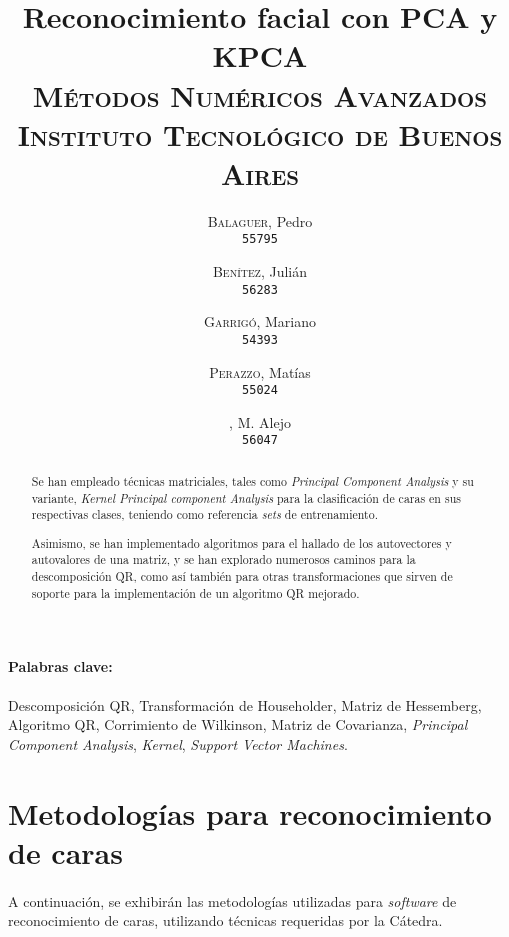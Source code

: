 \documentclass[12pt, twocolumn]{article}
\begin{document}
	\title{Reconocimiento facial con PCA y KPCA \\ 
		   \large{\textsc{Métodos Numéricos Avanzados}} \\
		   \normalsize{\textsc{Instituto Tecnológico de Buenos Aires}}}
	\author{
		\textsc{Balaguer}, Pedro \\
		\texttt{55795}
		\and
		\textsc{Benítez}, Julián \\
		\texttt{56283}
		\and
		\textsc{Garrigó}, Mariano \\
		\texttt{54393}
		\and
		\textsc{Perazzo}, Matías \\
		\texttt{55024}
		\and
		, M. Alejo \\
		\texttt{56047} 
	}
	\date{}
	\maketitle
	
	\begin{abstract}
		Se han empleado técnicas matriciales, tales como \textit{Principal Component Analysis} y su variante, \textit{Kernel Principal component Analysis} para la clasificación de caras en sus respectivas clases, teniendo como referencia \textit{sets} de entrenamiento.  
		
		Asimismo, se han implementado algoritmos para el hallado de los autovectores y autovalores de una matriz, y se han explorado numerosos caminos para la descomposición QR, como así también para otras transformaciones que sirven de soporte para la implementación de un algoritmo QR mejorado.   
	\end{abstract}
	
	\paragraph{Palabras clave:} Descomposición QR, Transformación de Householder, Matriz de Hessemberg, Algoritmo QR, Corrimiento de Wilkinson, Matriz de Covarianza, \textit{Principal Component Analysis}, \textit{Kernel}, \textit{Support Vector Machines}.
	
	\section{Metodologías para reconocimiento de caras}
	
	\paragraph{} A continuación, se exhibirán las metodologías utilizadas para \textit{software} de reconocimiento de caras, utilizando técnicas requeridas por la Cátedra. 	
	
\end{document}
